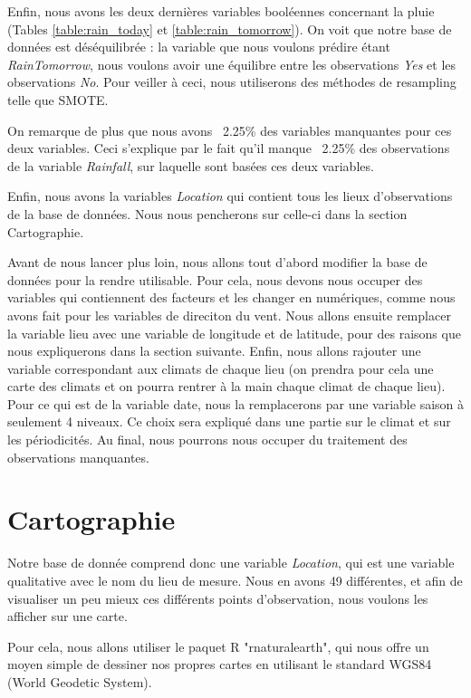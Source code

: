 \documentclass{article}
\begin{document}
Enfin, nous avons les deux dernières variables booléennes concernant la pluie (Tables \ref{table:rain_today} et \ref{table:rain_tomorrow}). On voit que notre base de données est déséquilibrée : la variable que nous voulons prédire étant \emph{RainTomorrow}, nous voulons avoir une équilibre entre les observations \emph{Yes} et les observations \emph{No}. Pour veiller à ceci, nous utiliserons des méthodes de resampling telle que SMOTE. 

On remarque de plus que nous avons ~2.25\% des variables manquantes pour ces deux variables. Ceci s'explique par le fait qu'il manque ~2.25\% des observations de la variable \emph{Rainfall}, sur laquelle sont basées ces deux variables.

Enfin, nous avons la variables \emph{Location} qui contient tous les lieux d'observations de la base de données. Nous nous pencherons sur celle-ci dans la section Cartographie. 

Avant de nous lancer plus loin, nous allons tout d'abord modifier la base de données pour la rendre utilisable. Pour cela, nous devons nous occuper des variables qui contiennent des facteurs et les changer en numériques, comme nous avons fait pour les variables de direciton du vent. Nous allons ensuite remplacer la variable lieu avec une variable de longitude et de latitude, pour des raisons que nous expliquerons dans la section suivante. Enfin, nous allons rajouter une variable correspondant aux climats de chaque lieu (on prendra pour cela une carte des climats et on pourra rentrer à la main chaque climat de chaque lieu). Pour ce qui est de la variable date, nous la remplacerons par une variable saison à seulement 4 niveaux. Ce choix sera expliqué dans une partie sur le climat et sur les périodicités. Au final, nous pourrons nous occuper du traitement des observations manquantes. 

\section{Cartographie}

Notre base de donnée comprend donc une variable \emph{Location}, qui est une variable qualitative avec le nom du lieu de mesure. Nous en avons 49 différentes, et afin de visualiser un peu mieux ces différents points d'observation, nous voulons les afficher sur une carte. 

Pour cela, nous allons utiliser le paquet R "rnaturalearth", qui nous offre un moyen simple de dessiner nos propres cartes en utilisant le standard WGS84 (World Geodetic System).
\end{document}
